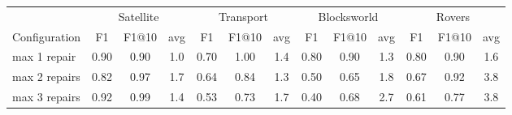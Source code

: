 \documentclass{standalone}
\begin{document}
\begin{tabular}{lcccccccccccc}
\toprule
 & \multicolumn{3}{c}{Satellite} & \multicolumn{3}{c}{Transport} & \multicolumn{3}{c}{Blocksworld} & \multicolumn{3}{c}{Rovers} \\
\cmidrule(lr){2-4} \cmidrule(lr){5-7} \cmidrule(lr){8-10} \cmidrule(lr){11-13}
Configuration & F1 & F1@10 & avg & F1 & F1@10 & avg & F1 & F1@10 & avg & F1 & F1@10 & avg \\
\midrule
max 1 repair & 0.90 & 0.90 & 1.0 & 0.70 & 1.00 & 1.4 & 0.80 & 0.90 & 1.3 & 0.80 & 0.90 & 1.6 \\
max 2 repairs & 0.82 & 0.97 & 1.7 & 0.64 & 0.84 & 1.3 & 0.50 & 0.65 & 1.8 & 0.67 & 0.92 & 3.8 \\
max 3 repairs & 0.92 & 0.99 & 1.4 & 0.53 & 0.73 & 1.7 & 0.40 & 0.68 & 2.7 & 0.61 & 0.77 & 3.8 \\
\bottomrule
\end{tabular}
\end{document}
